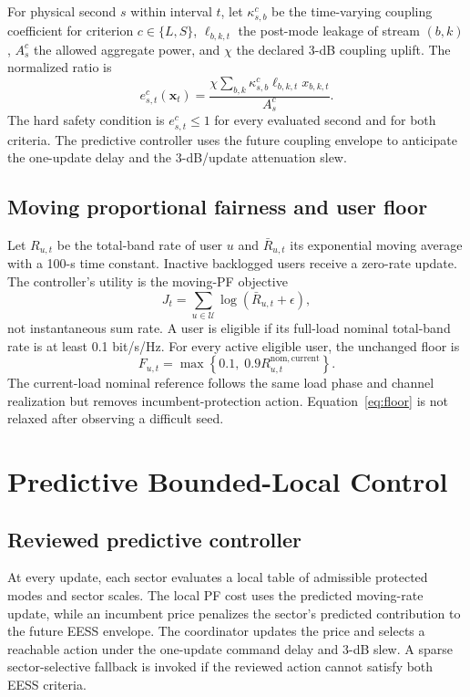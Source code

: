 \documentclass[journal]{IEEEtran}
\newcommand{\U}{\mathcal{U}}
\begin{document}


For physical second $s$ within interval $t$, let $\kappa^{c}_{s,b}$ be the time-varying coupling coefficient for criterion $c\in\{L,S\}$, $\ell_{b,k,t}$ the post-mode leakage of stream $(b,k)$, $A^{c}_{s}$ the allowed aggregate power, and $\chi$ the declared 3-dB coupling uplift. The normalized ratio is
\begin{equation}
 e^{c}_{s,t}(\bm x_t)=
 \frac{\chi\sum_{b,k}\kappa^{c}_{s,b}\ell_{b,k,t}x_{b,k,t}}
 {A^{c}_{s}}.
 \label{eq:eess}
\end{equation}
The hard safety condition is $e^{c}_{s,t}\le 1$ for every evaluated second and for both criteria. The predictive controller uses the future coupling envelope to anticipate the one-update delay and the 3-dB/update attenuation slew.

\subsection{Moving proportional fairness and user floor}
Let $R_{u,t}$ be the total-band rate of user $u$ and $\bar R_{u,t}$ its exponential moving average with a 100-s time constant. Inactive backlogged users receive a zero-rate update. The controller's utility is the moving-PF objective
\begin{equation}
 J_t=\sum_{u\in\U}\log\!\left(\bar R_{u,t}+\epsilon\right),
 \label{eq:pf}
\end{equation}
not instantaneous sum rate. A user is eligible if its full-load nominal total-band rate is at least 0.1 bit/s/Hz. For every active eligible user, the unchanged floor is
\begin{equation}
 F_{u,t}=\max\!\left\{0.1,\;0.9R^{\mathrm{nom,current}}_{u,t}\right\}.
 \label{eq:floor}
\end{equation}
The current-load nominal reference follows the same load phase and channel realization but removes incumbent-protection action. Equation~\eqref{eq:floor} is not relaxed after observing a difficult seed.

\section{Predictive Bounded-Local Control}
\subsection{Reviewed predictive controller}
At every update, each sector evaluates a local table of admissible protected modes and sector scales. The local PF cost uses the predicted moving-rate update, while an incumbent price penalizes the sector's predicted contribution to the future EESS envelope. The coordinator updates the price and selects a reachable action under the one-update command delay and 3-dB slew. A sparse sector-selective fallback is invoked if the reviewed action cannot satisfy both EESS criteria.
\end{document}
